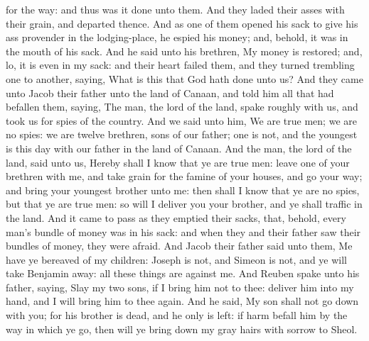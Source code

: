 for the way: and thus was it done unto them.  And they laded their asses with their grain, and departed thence. And as one of them opened his sack to give his ass provender in the lodging-place, he espied his money; and, behold, it was in the mouth of his sack. And he said unto his brethren, My money is restored; and, lo, it is even in my sack: and their heart failed them, and they turned trembling one to another, saying, What is this that God hath done unto us? And they came unto Jacob their father unto the land of Canaan, and told him all that had befallen them, saying, The man, the lord of the land, spake roughly with us, and took us for spies of the country. And we said unto him, We are true men; we are no spies: we are twelve brethren, sons of our father; one is not, and the youngest is this day with our father in the land of Canaan. And the man, the lord of the land, said unto us, Hereby shall I know that ye are true men: leave one of your brethren with me, and take grain for the famine of your houses, and go your way; and bring your youngest brother unto me: then shall I know that ye are no spies, but that ye are true men: so will I deliver you your brother, and ye shall traffic in the land.  And it came to pass as they emptied their sacks, that, behold, every man’s bundle of money was in his sack: and when they and their father saw their bundles of money, they were afraid. And Jacob their father said unto them, Me have ye bereaved of my children: Joseph is not, and Simeon is not, and ye will take Benjamin away: all these things are against me. And Reuben spake unto his father, saying, Slay my two sons, if I bring him not to thee: deliver him into my hand, and I will bring him to thee again. And he said, My son shall not go down with you; for his brother is dead, and he only is left: if harm befall him by the way in which ye go, then will ye bring down my gray hairs with sorrow to Sheol. 

